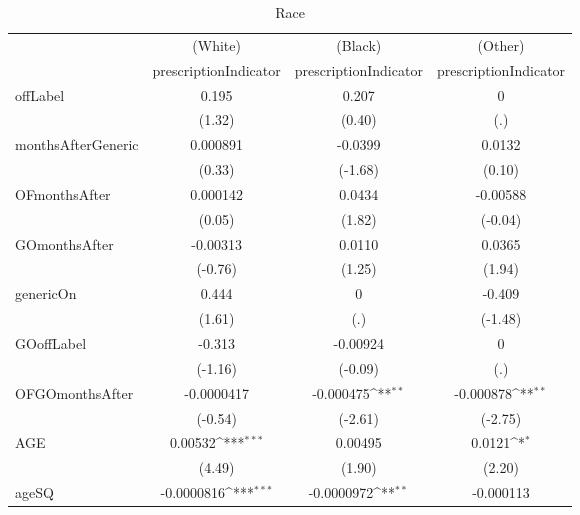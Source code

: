 \begin{table}[htbp]\centering
\def\sym#1{\ifmmode^{#1}\else\(^{#1}\)\fi}
\caption{Race\label{tab1}}
\begin{tabular}{l*{3}{c}}
\hline\hline
            &\multicolumn{1}{c}{(White)}&\multicolumn{1}{c}{(Black)}&\multicolumn{1}{c}{(Other)}\\
            &\multicolumn{1}{c}{prescriptionIndicator}&\multicolumn{1}{c}{prescriptionIndicator}&\multicolumn{1}{c}{prescriptionIndicator}\\
\hline
offLabel    &       0.195         &       0.207         &           0         \\
            &      (1.32)         &      (0.40)         &         (.)         \\
[1em]
monthsAfterGeneric&    0.000891         &     -0.0399         &      0.0132         \\
            &      (0.33)         &     (-1.68)         &      (0.10)         \\
[1em]
OFmonthsAfter&    0.000142         &      0.0434         &    -0.00588         \\
            &      (0.05)         &      (1.82)         &     (-0.04)         \\
[1em]
GOmonthsAfter&    -0.00313         &      0.0110         &      0.0365         \\
            &     (-0.76)         &      (1.25)         &      (1.94)         \\
[1em]
genericOn   &       0.444         &           0         &      -0.409         \\
            &      (1.61)         &         (.)         &     (-1.48)         \\
[1em]
GOoffLabel  &      -0.313         &    -0.00924         &           0         \\
            &     (-1.16)         &     (-0.09)         &         (.)         \\
[1em]
OFGOmonthsAfter&  -0.0000417         &   -0.000475\sym{**} &   -0.000878\sym{**} \\
            &     (-0.54)         &     (-2.61)         &     (-2.75)         \\
[1em]
AGE         &     0.00532\sym{***}&     0.00495         &      0.0121\sym{*}  \\
            &      (4.49)         &      (1.90)         &      (2.20)         \\
[1em]
ageSQ       &  -0.0000816\sym{***}&  -0.0000972\sym{**} &   -0.000113         \\

\end{tabular}
\end{table}
